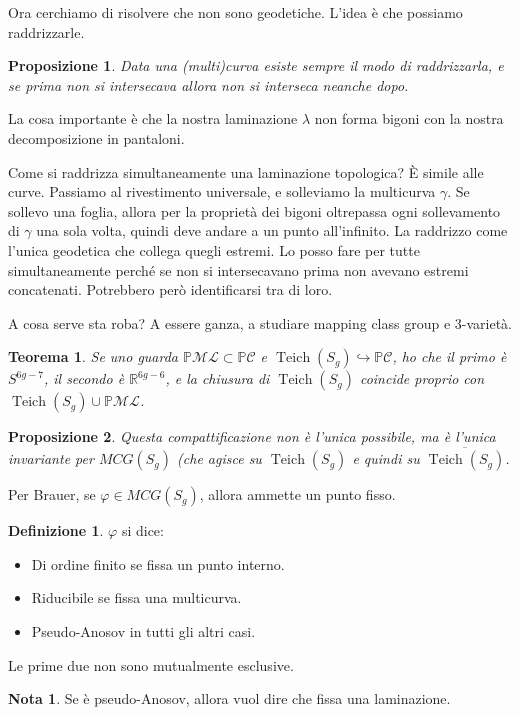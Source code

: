 \documentclass[a4paper]{article}
\newtheorem{theorem}{Teorema}
\newtheorem{proposition}{Proposizione}
\theoremstyle{definition}
\newtheorem{definition}{Definizione}
\newtheorem{remark}{Nota}
\DeclareMathOperator{\Teich}{Teich}
\begin{document}
    Ora cerchiamo di risolvere che non sono geodetiche. L'idea è che possiamo raddrizzarle.

    \begin{proposition}
        Data una (multi)curva esiste sempre il modo di raddrizzarla, e se prima non si intersecava allora non si interseca neanche dopo.
    \end{proposition}

    La cosa importante è che la nostra laminazione $\lambda$ non forma bigoni con la nostra decomposizione in pantaloni.

    Come si raddrizza simultaneamente una laminazione topologica? È simile alle curve. Passiamo al rivestimento universale, e solleviamo la multicurva $\gamma$. Se sollevo una foglia, allora per la proprietà dei bigoni oltrepassa ogni sollevamento di $\gamma$ una sola volta, quindi deve andare a un punto all'infinito. La raddrizzo come l'unica geodetica che collega quegli estremi. Lo posso fare per tutte simultaneamente perché se non si intersecavano prima non avevano estremi concatenati. Potrebbero però identificarsi tra di loro.

    A cosa serve sta roba? A essere ganza, a studiare mapping class group e $3$-varietà.

    \begin{theorem}
        Se uno guarda $\mathbb P\mathcal{ML} \subset \mathbb P\mathcal C$ e $\Teich(S_g) \hookrightarrow \mathbb P\mathcal C$, ho che il primo è $S^{6g - 7}$, il secondo è $\mathbb R^{6g - 6}$, e la chiusura di $\Teich(S_g)$ coincide proprio con $\Teich(S_g) \cup \mathbb P\mathcal{ML}$.
    \end{theorem}

    \begin{proposition}
        Questa compattificazione non è l'unica possibile, ma è l'unica invariante per $MCG(S_g)$ (che agisce su $\Teich(S_g)$ e quindi su $\overline{\Teich(S_g)}$.
    \end{proposition}

    Per Brauer, se $\varphi \in MCG(S_g)$, allora ammette un punto fisso.
    \begin{definition}
        $\varphi$ si dice:
        \begin{itemize}
            \item Di ordine finito se fissa un punto interno.
            \item Riducibile se fissa una multicurva.
            \item Pseudo-Anosov in tutti gli altri casi.
        \end{itemize}
        Le prime due non sono mutualmente esclusive.
    \end{definition}

    \begin{remark}
        Se è pseudo-Anosov, allora vuol dire che fissa una laminazione.
    \end{remark}
    
    
    
    
\end{document}
